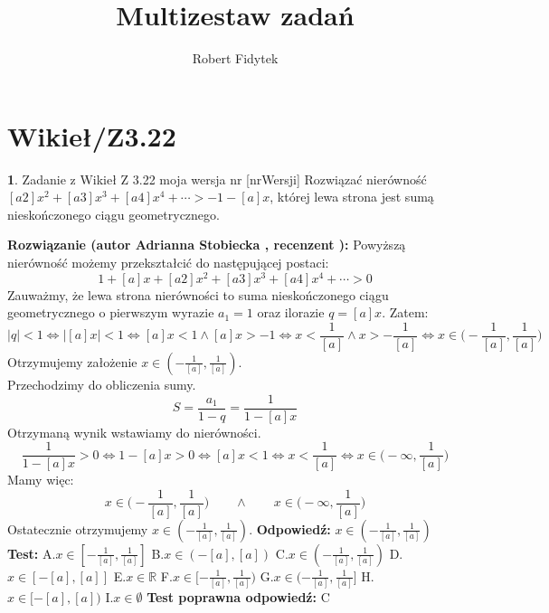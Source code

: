\documentclass[12pt, a4paper]{article}
\title{Multizestaw zadań}
\author{Robert Fidytek}
\date{}
\theoremstyle{definition} %
\newtheorem{zad}{}
\newcommand{\kategoria}[1]{\section{#1}} %
\newcommand{\zadStart}[1]{\begin{zad}#1\newline} %
\newcommand{\zadStop}{\end{zad}}   %
\newcommand{\rozwStart}[2]{\noindent \textbf{Rozwiązanie (autor #1 , recenzent #2): }\newline} %
\newcommand{\odpStart}{\noindent \textbf{Odpowiedź:}\newline}    %
\newcommand{\odpStop}{\newline}                                             %
\newcommand{\testStart}{\noindent \textbf{Test:}\newline} %
\newcommand{\testStop}{\newline} %
\newcommand{\kluczStart}{\noindent \textbf{Test poprawna odpowiedź:}\newline} %
\newcommand{\kluczStop}{\newline} %
\begin{document}
\maketitle


\kategoria{Wikieł/Z3.22}
\zadStart{Zadanie z Wikieł Z 3.22 moja wersja nr [nrWersji]}
%
Rozwiązać nierówność $[a2]x^2+[a3]x^3+[a4]x^4+\cdots>-1-[a]x$, której lewa strona jest sumą nieskończonego ciągu geometrycznego.
\zadStop
\rozwStart{Adrianna Stobiecka}{}
Powyższą nierówność możemy przekształcić do następującej postaci:
$$1+[a]x+[a2]x^2+[a3]x^3+[a4]x^4+\cdots>0$$
Zauważmy, że lewa strona nierówności to suma nieskończonego ciągu geometrycznego o pierwszym wyrazie $a_1=1$ oraz ilorazie $q=[a]x$. Zatem:
$$|q|<1\Leftrightarrow|[a]x|<1\Leftrightarrow[a]x<1\land[a]x>-1\Leftrightarrow x<\frac{1}{[a]}\land x>-\frac{1}{[a]}\Leftrightarrow x\in\bigg(-\frac{1}{[a]},\frac{1}{[a]}\bigg)$$
Otrzymujemy założenie $x\in(-\frac{1}{[a]},\frac{1}{[a]})$.
\\Przechodzimy do obliczenia sumy.
$$S=\frac{a_1}{1-q}=\frac{1}{1-[a]x}$$
Otrzymaną wynik wstawiamy do nierówności.
$$\frac{1}{1-[a]x}>0\Leftrightarrow 1-[a]x>0\Leftrightarrow[a]x<1\Leftrightarrow x<\frac{1}{[a]}\Leftrightarrow x\in\bigg(-\infty,\frac{1}{[a]}\bigg)$$
Mamy więc:
$$x\in\bigg(-\frac{1}{[a]},\frac{1}{[a]}\bigg)\qquad\land\qquad x\in\bigg(-\infty,\frac{1}{[a]}\bigg)$$
Ostatecznie otrzymujemy $x\in(-\frac{1}{[a]},\frac{1}{[a]})$.
\odpStart
 $x\in(-\frac{1}{[a]},\frac{1}{[a]})$
\odpStop
\testStart
A.$x\in[-\frac{1}{[a]},\frac{1}{[a]}]$
B.$x\in(-[a],[a])$
C.$x\in(-\frac{1}{[a]},\frac{1}{[a]})$
D.$x\in[-[a],[a]]$
E.$x\in\mathbb{R}$
F.$x\in[-\frac{1}{[a]},\frac{1}{[a]})$
G.$x\in(-\frac{1}{[a]},\frac{1}{[a]}]$
H.$x\in[-[a],[a])$
I.$x\in\emptyset$
\testStop
\kluczStart
C
\kluczStop
\end{document}
